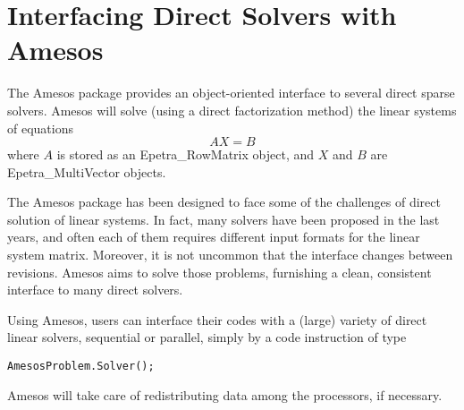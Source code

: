 % 
% 
% 
%   
%   
% 
% 

\section{Interfacing Direct Solvers with Amesos}
\label{chap:amesos}

The Amesos package provides an object-oriented interface to several
direct sparse solvers. Amesos will solve (using a direct factorization
method) the linear systems of equations
\begin{equation}
\label{eq:amesos_ls}
A X = B
\end{equation}
where $A$ is stored as an Epetra\_RowMatrix object, and $X$ and $B$ are
Epetra\_MultiVector objects.

The Amesos package has been designed to face some of the challenges of
direct solution of linear systems. In fact, many solvers have been
proposed in the last years, and often each of them requires different
input formats for the linear system matrix. Moreover, it is not uncommon
that the interface changes between revisions. Amesos aims to solve those
problems, furnishing a clean, consistent interface to many direct
solvers.

Using Amesos, users can interface their codes with a (large) variety of
direct linear solvers, sequential or parallel, simply by a code
instruction of type
\begin{verbatim}
AmesosProblem.Solver();
\end{verbatim}
Amesos will take care of redistributing data among the processors, if
necessary.

